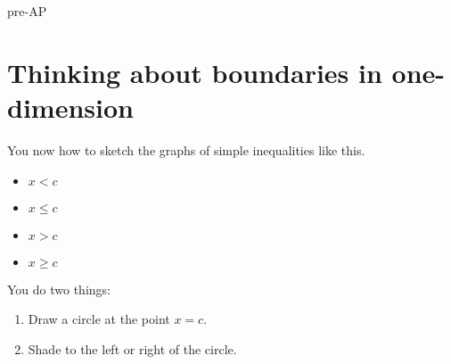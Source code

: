 \begin{taggedblock}{pre-AP}

\section*{Thinking about boundaries in one-dimension}

You now how to sketch the graphs of simple inequalities like this.

\begin{center}
\begin{minipage}{0.4\textwidth}
    \begin{itemize}[itemsep=0in]
        \item $x <    c$
        \item $x \leq c$
    \end{itemize}
\end{minipage}
\begin{minipage}{0.4\textwidth}
    \begin{itemize}[itemsep=0in]
        \item $x >    c$
        \item $x \geq c$
    \end{itemize}
\end{minipage}
\end{center}

\noindent
You do two things:
\begin{enumerate}
    \item Draw a circle at the point $x=c$.
    \item Shade to the left or right of the circle.
\end{enumerate}


\end{taggedblock}
